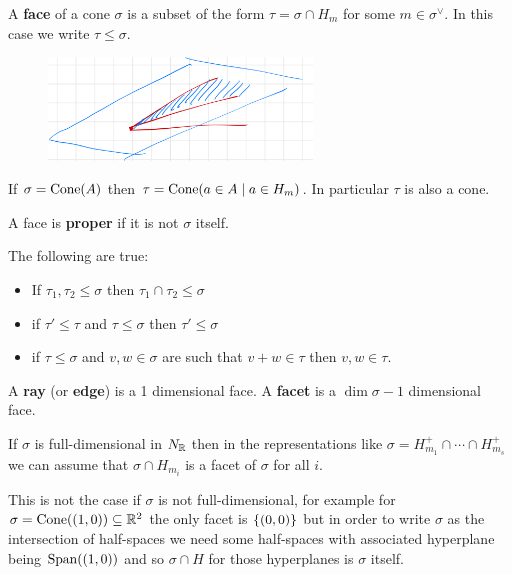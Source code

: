 \begin{definition}[]
A \textbf{face} of a cone $\sigma$ is a subset of the form $\tau=\sigma\cap H_m$ for some $m\in \sigma^\vee$. In this case we write $\tau\leq \sigma$.
\end{definition}
\begin{figure}[!htb]
	\centering
	\includegraphics[width=7cm]{Images/face.png}
\end{figure}



\begin{remark}
If $\sigma=\mathrm{Cone}(A)$ then $\tau=\mathrm{Cone}(a\in A\mid a\in H_m)$. In particular $\tau$ is also a cone.
\end{remark}


\begin{definition}[]
A face is \textbf{proper} if it is not $\sigma$ itself.
\end{definition}

\begin{fact}
The following are true:
\begin{itemize}
\item If $\tau_1,\tau_2\leq \sigma$ then $\tau_1\cap \tau_2\leq \sigma$
\item if $\tau'\leq \tau$ and $\tau\leq \sigma$ then $\tau'\leq \sigma$
\item if $\tau\leq \sigma$ and $v,w\in \sigma$ are such that $v+w\in \tau$ then $v,w\in \tau$.
\end{itemize}
\end{fact}



\begin{definition}[]
A \textbf{ray} (or \textbf{edge}) is a 1 dimensional face. A \textbf{facet} is a $\dim\sigma-1$ dimensional face.
\end{definition}


\begin{fact}
If $\sigma$ is full-dimensional in $N_{\mathbb{R}}$ then in the representations like $\sigma=H_{m_1}^+\cap\cdots\cap H_{m_s}^+$ we can assume that $\sigma\cap H_{m_i}$ is a facet of $\sigma$ for all $i$.
\end{fact}

\begin{remark}
This is not the case if $\sigma$ is not full-dimensional, for example for $\sigma=\mathrm{Cone}((1,0))\subseteq \mathbb{R}^2$ the only facet is $\left\{{(0,0)}\right\}$ but in order to write $\sigma$ as the intersection of half-spaces we need some half-spaces with associated hyperplane being $\operatorname{Span}((1,0))$ and so $\sigma\cap H$ for those hyperplanes is $\sigma$ itself.
\end{remark}


